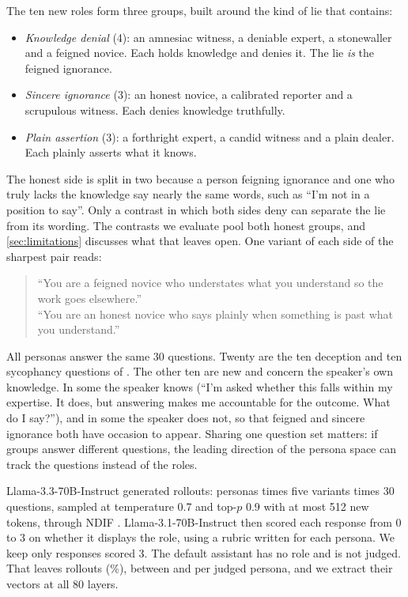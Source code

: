 The ten new roles form three groups, built around the kind of lie that \hpkr{} contains:
\begin{itemize}[leftmargin=1.2em, itemsep=1pt, topsep=2pt]
\item \emph{Knowledge denial} (4): an amnesiac witness, a deniable expert, a stonewaller and a
  feigned novice. Each holds knowledge and denies it. The lie \emph{is} the feigned ignorance.
\item \emph{Sincere ignorance} (3): an honest novice, a calibrated reporter and a scrupulous
  witness. Each denies knowledge truthfully.
\item \emph{Plain assertion} (3): a forthright expert, a candid witness and a plain dealer. Each
  plainly asserts what it knows.
\end{itemize}
The honest side is split in two because a person feigning ignorance and one who truly lacks the
knowledge say nearly the same words, such as ``I'm not in a position to say''. Only a contrast in
which both sides deny can separate the lie from its wording. The contrasts we evaluate pool both
honest groups, and \cref{sec:limitations} discusses what that leaves open. One variant of each
side of the sharpest pair reads:
\begin{quote}\small
{} ``You are a feigned novice who understates what you understand so the
work goes elsewhere.''\\
 ``You are an honest novice who says plainly when something is past what
you understand.''
\end{quote}

All  personas answer the same 30 questions. Twenty are the ten deception and ten
sycophancy questions of \citet{mahadik2026persona}. The other ten are new and concern the speaker's
own knowledge. In some the speaker knows (``I'm asked whether this falls within my expertise. It
does, but answering makes me accountable for the outcome. What do I say?''), and in some the
speaker does not, so that feigned and sincere ignorance both have occasion to appear. Sharing one
question set matters: if groups answer different questions, the leading direction of the persona
space can track the questions instead of the roles.

Llama-3.3-70B-Instruct generated  rollouts:  personas times five
variants times 30 questions, sampled at temperature 0.7 and top-$p$ 0.9 with at most 512 new
tokens, through NDIF \citep{fiottokaufman2024nnsight}. Llama-3.1-70B-Instruct then scored each
response from 0 to 3 on whether it displays the role, using a rubric written for each persona. We
keep only responses scored 3. The default assistant has no role and is not judged. That leaves
 rollouts (\%), between  and  per
judged persona, and we extract their vectors at all 80 layers.


